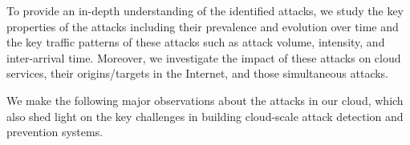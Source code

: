 To provide an in-depth understanding of the identified attacks, we study the
key properties of the attacks including their prevalence and evolution over
time and the key traffic patterns of these attacks such as attack volume,
intensity, and inter-arrival time.  Moreover, we investigate the impact of
these attacks on cloud services, their origins/targets in the Internet, and
those simultaneous attacks.











We make the following major observations about the attacks in our cloud,  
which also shed light on the key challenges in building cloud-scale attack detection and prevention systems. 


